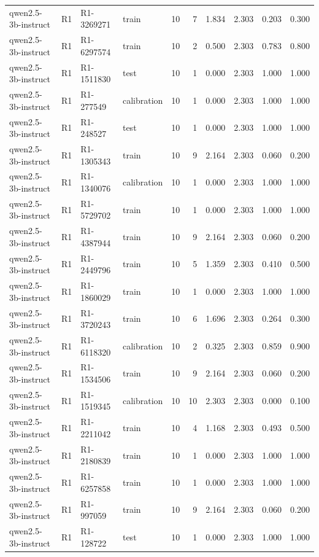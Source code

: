 \begin{table}
\begin{tabular}{llllrrrrrr}
qwen2.5-3b-instruct & R1 & R1-3269271 & train & 10 & 7 & 1.834 & 2.303 & 0.203 & 0.300 \\
qwen2.5-3b-instruct & R1 & R1-6297574 & train & 10 & 2 & 0.500 & 2.303 & 0.783 & 0.800 \\
qwen2.5-3b-instruct & R1 & R1-1511830 & test & 10 & 1 & 0.000 & 2.303 & 1.000 & 1.000 \\
qwen2.5-3b-instruct & R1 & R1-277549 & calibration & 10 & 1 & 0.000 & 2.303 & 1.000 & 1.000 \\
qwen2.5-3b-instruct & R1 & R1-248527 & test & 10 & 1 & 0.000 & 2.303 & 1.000 & 1.000 \\
qwen2.5-3b-instruct & R1 & R1-1305343 & train & 10 & 9 & 2.164 & 2.303 & 0.060 & 0.200 \\
qwen2.5-3b-instruct & R1 & R1-1340076 & calibration & 10 & 1 & 0.000 & 2.303 & 1.000 & 1.000 \\
qwen2.5-3b-instruct & R1 & R1-5729702 & train & 10 & 1 & 0.000 & 2.303 & 1.000 & 1.000 \\
qwen2.5-3b-instruct & R1 & R1-4387944 & train & 10 & 9 & 2.164 & 2.303 & 0.060 & 0.200 \\
qwen2.5-3b-instruct & R1 & R1-2449796 & train & 10 & 5 & 1.359 & 2.303 & 0.410 & 0.500 \\
qwen2.5-3b-instruct & R1 & R1-1860029 & train & 10 & 1 & 0.000 & 2.303 & 1.000 & 1.000 \\
qwen2.5-3b-instruct & R1 & R1-3720243 & train & 10 & 6 & 1.696 & 2.303 & 0.264 & 0.300 \\
qwen2.5-3b-instruct & R1 & R1-6118320 & calibration & 10 & 2 & 0.325 & 2.303 & 0.859 & 0.900 \\
qwen2.5-3b-instruct & R1 & R1-1534506 & train & 10 & 9 & 2.164 & 2.303 & 0.060 & 0.200 \\
qwen2.5-3b-instruct & R1 & R1-1519345 & calibration & 10 & 10 & 2.303 & 2.303 & 0.000 & 0.100 \\
qwen2.5-3b-instruct & R1 & R1-2211042 & train & 10 & 4 & 1.168 & 2.303 & 0.493 & 0.500 \\
qwen2.5-3b-instruct & R1 & R1-2180839 & train & 10 & 1 & 0.000 & 2.303 & 1.000 & 1.000 \\
qwen2.5-3b-instruct & R1 & R1-6257858 & train & 10 & 1 & 0.000 & 2.303 & 1.000 & 1.000 \\
qwen2.5-3b-instruct & R1 & R1-997059 & train & 10 & 9 & 2.164 & 2.303 & 0.060 & 0.200 \\
qwen2.5-3b-instruct & R1 & R1-128722 & test & 10 & 1 & 0.000 & 2.303 & 1.000 & 1.000 \\

\end{tabular}
\end{table}
